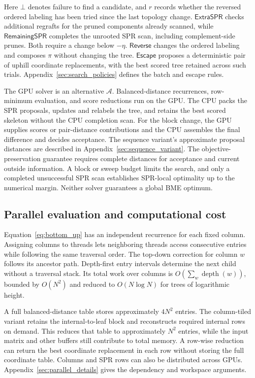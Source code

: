 \documentclass[11pt,a4paper]{article}
\makeatletter
\newcommand{\proc}[1]{\mathsf{#1}}
\DeclareRobustCommand{\_}{\ifmmode\nfss@text{\textunderscore}\else\textunderscore\allowbreak\fi}
\theoremstyle{definition}
\makeatother
\begin{document}
Here $\bot$ denotes failure to find a candidate, and $r$ records whether the reversed ordered labeling has been tried since the last topology change.
$\proc{ExtraSPR}$ checks additional regrafts for the pruned components already scanned, while $\proc{RemainingSPR}$ completes the unrooted SPR scan, including complement-side prunes.
Both require a change below $-\eta$.
$\proc{Reverse}$ changes the ordered labeling and composes $\pi$ without changing the tree.
$\proc{Escape}$ proposes a deterministic pair of uphill coordinate replacements, with the best scored tree retained across such trials.
Appendix~\ref{sec:search_policies} defines the batch and escape rules.

The GPU solver is an alternative $\mathcal A$.
Balanced-distance recurrences, row-minimum evaluation, and score reductions run on the GPU.
The CPU packs the SPR proposals, updates and relabels the tree, and retains the best scored skeleton without the CPU completion scan.
For the block change, the GPU supplies scores or pair-distance contributions and the CPU assembles the final difference and decides acceptance.
The sequence variant's approximate proposal distances are described in Appendix~\ref{sec:sequence_variant}.
The objective-preservation guarantee requires complete distances for acceptance and current outside information.
A block or sweep budget limits the search, and only a completed unsuccessful SPR scan establishes SPR-local optimality up to the numerical margin.
Neither solver guarantees a global BME optimum.

\subsection{Parallel evaluation and computational cost}
\label{sec:parallel}

Equation~\eqref{eq:bottom_up} has an independent recurrence for each fixed column.
Assigning columns to threads lets neighboring threads access consecutive entries while following the same traversal order.
The top-down correction for column $w$ follows its ancestor path.
Depth-first entry intervals determine the next child without a traversal stack.
Its total work over columns is $O(\sum_w\operatorname{depth}(w))$, bounded by $O(N^2)$ and reduced to $O(N\log N)$ for trees of logarithmic height.

A full balanced-distance table stores approximately $4N^2$ entries.
The column-tiled variant retains the internal-to-leaf block and reconstructs required internal rows on demand.
This reduces that table to approximately $N^2$ entries, while the input matrix and other buffers still contribute to total memory.
A row-wise reduction can return the best coordinate replacement in each row without storing the full coordinate table.
Columns and SPR rows can also be distributed across GPUs.
Appendix~\ref{sec:parallel_details} gives the dependency and workspace arguments.
\end{document}
